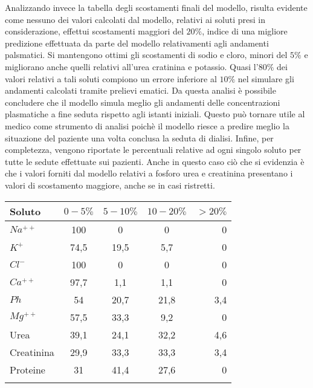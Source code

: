 \documentclass[10pt,twoside]{book}
\begin{document}
\newline
Analizzando invece la tabella degli scostamenti finali del modello, risulta evidente come nessuno dei valori calcolati dal modello, relativi ai soluti presi in considerazione, effettui scostamenti maggiori del $20\%$, indice di una migliore predizione effettuata da parte del modello relativamenti agli andamenti palsmatici. Si mantengono ottimi gli scostamenti di sodio e cloro, minori del $5\%$ e migliorano anche quelli relativi all'urea cratinina e potassio. Quasi l'$80\%$ dei valori relativi a tali soluti compiono un errore inferiore al $10\%$ nel simulare gli andamenti calcolati tramite prelievi ematici.
Da questa analisi è possibile concludere che il modello simula meglio gli andamenti delle concentrazioni plasmatiche a fine seduta rispetto agli istanti iniziali. Questo può tornare utile al medico come strumento di analisi poichè il modello riesce a predire meglio la situazione del paziente una volta conclusa la seduta di dialisi.
Infine, per completezza, vengono riportate le percentuali relative ad ogni singolo soluto per tutte le sedute effettuate sui pazienti. Anche in questo caso ciò che si evidenzia è che i valori forniti dal modello relativi a fosforo urea e creatinina presentano i valori di scostamento maggiore, anche se in casi ristretti.
\newline
\begin{tabular}{lcccr}
\toprule
Soluto & $0-5\%$ & $5-10\%$ & $10-20\%$ & $>20\%$\\
\midrule
$Na^{++}$& 100 & 0 & 0 & 0\\
$K^{+}$ & 74,5 & 19,5 & 5,7 & 0\\ 
$Cl^{-}$& 100 & 0 & 0 & 0\\
$Ca^{++}$& 97,7 & 1,1 & 1,1 & 0\\
$Ph$ & 54 &  20,7 & 21,8 & 3,4\\
$Mg^{++}$& 57,5 &  33,3 & 9,2 & 0\\
Urea & 39,1 & 24,1 & 32,2 & 4,6\\
Creatinina & 29,9 & 33,3 & 33,3 & 3,4\\
Proteine & 31 &  41,4 & 27,6 & 0\\
\bottomrule
\caption{Percentuali scostamenti sedute totali }
\end{tabular}
\end{document}
